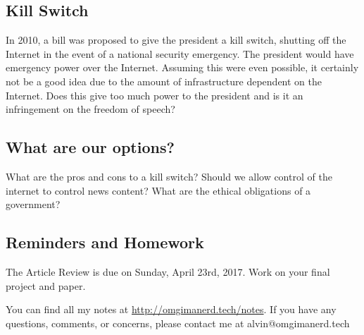 \documentclass{article}
\begin{document}
\subsection*{Kill Switch}
In 2010, a bill was proposed to give the president a kill switch, shutting off
the Internet in the event of a national security emergency. The president
would have emergency power over the Internet. Assuming this were even possible,
it certainly not be a good idea due to the amount of infrastructure dependent on
the Internet. Does this give too much power to the president and is it an
infringement on the freedom of speech?

\subsection*{What are our options?}
What are the pros and cons to a kill switch? Should we allow control of the
internet to control news content? What are the ethical obligations of a
government?

\subsection*{Reminders and Homework}
The Article Review is due on Sunday, April 23rd, 2017.
Work on your final project and paper.

\begin{center}
  You can find all my notes at \url{http://omgimanerd.tech/notes}. If you have
  any questions, comments, or concerns, please contact me at
  alvin@omgimanerd.tech
\end{center}
\end{document}
